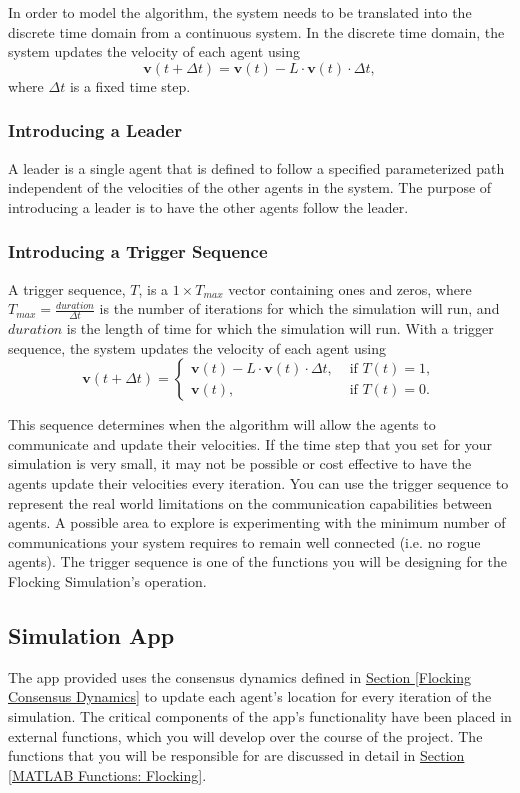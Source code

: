 \documentclass[../CourseManual.tex]{subfiles}
\begin{document}
In order to model the algorithm, the system needs to be translated into the discrete time domain from a continuous system. In the discrete time domain, the system updates the velocity of each agent using
\[
\boldsymbol{v}(t+\Delta t) = \boldsymbol{v}(t) - L \cdot \boldsymbol{v}(t) \cdot \Delta t,
\]
where $\Delta t$ is a fixed time step. 

\subsubsection{Introducing a Leader} \label{Introducing A Leader}
A leader is a single agent that is defined to follow a specified parameterized path independent of the velocities of the other agents in the system. The purpose of introducing a leader is to have the other agents follow the leader. 

\subsubsection{Introducing a Trigger Sequence} \label{Introducing a Trigger Sequence}
A trigger sequence, $T$, is a $1\times T_{max}$ vector containing ones and zeros, where $T_{max} = \frac{duration}{\Delta t}$ is the number of iterations for which the simulation will run, and $duration$ is the length of time for which the simulation will run. With a trigger sequence, the system updates the velocity of each agent using
\[
\boldsymbol{v}(t+ \Delta t) =
\begin{cases}
    \boldsymbol{v}(t) - L \cdot \boldsymbol{v}(t) \cdot \Delta t, & \text{ if } T(t) = 1,\\
    \boldsymbol{v}(t), & \text{ if } T(t) = 0.
\end{cases}
\]

This sequence determines when the algorithm will allow the agents to communicate and update their velocities. If the time step that you set for your simulation is very small, it may not be possible or cost effective to have the agents update their velocities every iteration. You can use the trigger sequence to represent the real world limitations on the communication capabilities between agents. A possible area to explore is experimenting with the minimum number of communications your system requires to remain well connected (i.e. no rogue agents). The trigger sequence is one of the functions you will be designing for the Flocking Simulation's operation.

\subsection{Simulation App} \label{Simualtion App: Flocking}
The app provided uses the consensus dynamics defined in \hyperref[Flocking Consensus Dynamics]{Section \ref{Flocking Consensus Dynamics}} to update each agent’s location for every iteration of the simulation.  The critical components of the app's functionality have been placed in external functions, which you will develop over the course of the project. The functions that you will be responsible for are discussed in detail in \hyperref[MATLAB Functions: Flocking]{Section \ref{MATLAB Functions: Flocking}}. \\
\end{document}
